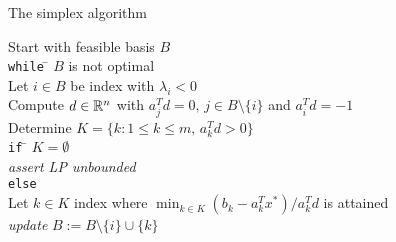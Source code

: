 \begin{frame}{The simplex algorithm}
 \begin{tabbing}
    Start with feasible basis $B$ \\[1ex]
    {\tt while} \= $B$ is not optimal \\ [.7ex]
    \> Let $i \in B$ be index with $\lambda_i<0$ \\
    \> Compute  $d \in \mathbb{R}^n$ with $a_j^T d = 0, \, j \in B \setminus\{i\}$
    and $a_i^T d = -1$ \\ 
    \> Determine $K = \{ k \colon 1 \leq k \leq m, \, a_k^Td >0\}$\\[.7ex]  
    \> {\tt if} \= $K = \emptyset$ \\   
    \> \> \emph{assert LP unbounded} \\
    \> {\tt else} \\
    \> \> Let $k \in K$ index where 
    $
    \displaystyle \min_{k \in K} (b_k - a_k^Tx^*)/a_k^Td
    $
    is attained \\ %
    
    \> \>\emph{update} $B := B \setminus\{i\} \cup \{k\}$             
  \end{tabbing}
  \begin{columns}
    \begin{column}{.5\textwidth}
      
    \end{column}
    \begin{column}{.5\textwidth}
      
    \end{column}       
  \end{columns}
\end{frame}


